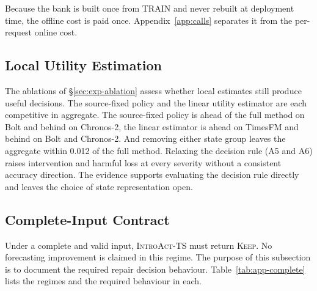 \documentclass{article}
\newcommand{\introact}{\textsc{IntroAct-TS}}
\begin{document}
Because the bank is built once from TRAIN and never rebuilt at deployment time, the offline
cost is paid once. Appendix~\ref{app:calls} separates it from the per-request online cost.

\subsection{Local Utility Estimation}
\label{app:transfer}
The ablations of \S\ref{sec:exp-ablation} assess whether local estimates still produce
useful decisions. The source-fixed policy and the linear utility estimator are each
competitive in aggregate. The source-fixed policy is ahead of the full method on Bolt and
behind on Chronos-2, the linear estimator is ahead on TimesFM and behind on Bolt and
Chronos-2. And removing either state group leaves the aggregate within 0.012 of the full
method. Relaxing the decision rule (A5 and A6) raises intervention and harmful loss at
every severity without a consistent accuracy direction. The evidence supports evaluating
the decision rule directly and leaves the choice of state representation open.

\subsection{Complete-Input Contract}
\label{app:contract}
Under a complete and valid input, \introact{} must return \textsc{Keep}. No forecasting
improvement is claimed in this regime. The purpose of this subsection is to document the
required repair decision behaviour. Table~\ref{tab:app-complete} lists the
regimes and the required behaviour in each.

\begin{table}[!t]
  \caption{Repair Decision contract by input regime. The complete-input rows are contract
  statements and not accuracy results. The expected behaviour there is a no-op, and a non-no-op
  would violate the input-preservation requirement.}
  \label{tab:app-complete}
  \centering
  \small
  \setlength{\tabcolsep}{4pt}
\end{table}
\end{document}
